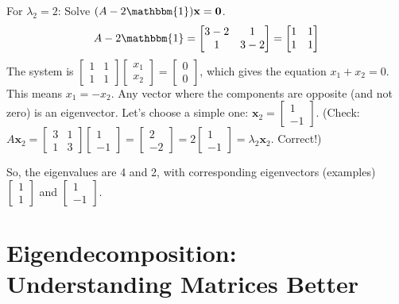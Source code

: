 \documentclass[11pt]{article}
\newcommand{\x}{\mathbf{x}}
\newcommand{\id}{\mathbbm{1}}
\begin{document}
\begin{example}
\begin{enumerate}
        For $\lambda_2 = 2$: Solve $(A - 2\id)\x = \mathbf{0}$.
        \[ A - 2\id = \begin{bmatrix} 3-2 & 1 \\ 1 & 3-2 \end{bmatrix} = \begin{bmatrix} 1 & 1 \\ 1 & 1 \end{bmatrix} \]
        The system is $\begin{bmatrix} 1 & 1 \\ 1 & 1 \end{bmatrix} \begin{bmatrix} x_1 \\ x_2 \end{bmatrix} = \begin{bmatrix} 0 \\ 0 \end{bmatrix}$, which gives the equation $x_1 + x_2 = 0$. This means $x_1 = -x_2$.
        Any vector where the components are opposite (and not zero) is an eigenvector. Let's choose a simple one: $\x_2 = \begin{bmatrix} 1 \\ -1 \end{bmatrix}$.
        (Check: $A\x_2 = \begin{bmatrix} 3 & 1 \\ 1 & 3 \end{bmatrix} \begin{bmatrix} 1 \\ -1 \end{bmatrix} = \begin{bmatrix} 2 \\ -2 \end{bmatrix} = 2 \begin{bmatrix} 1 \\ -1 \end{bmatrix} = \lambda_2 \x_2$. Correct!)
\end{enumerate}
So, the eigenvalues are 4 and 2, with corresponding eigenvectors (examples) $\begin{bmatrix} 1 \\ 1 \end{bmatrix}$ and $\begin{bmatrix} 1 \\ -1 \end{bmatrix}$.
\end{example}

\section{Eigendecomposition: Understanding Matrices Better}
\end{document}
